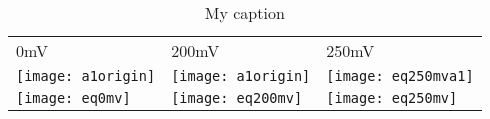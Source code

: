 \begin{table}
\centering
\caption{My caption}
\label{my-label}
\begin{tabular}{|l|l|l|}
\hline
0mV      & 200mV    & 250mV    \\
\texttt{[image: a1origin]} & \texttt{[image: a1origin]} & \texttt{[image: eq250mva1]} \\
\texttt{[image: eq0mv]}   & \texttt{[image: eq200mv]}   & \texttt{[image: eq250mv]}  \\ \hline
\end{tabular}
\end{table}





